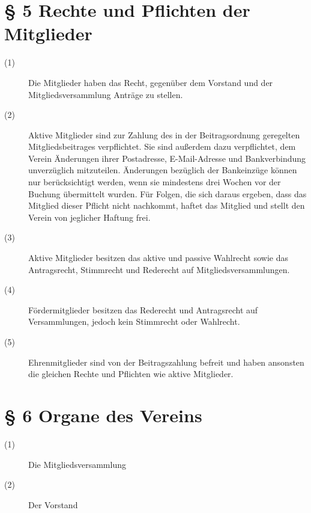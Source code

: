 \documentclass[a4paper,12pt]{scrartcl}
\begin{document}
\begin{description}
\end{description}



\section*{\S{} 5 Rechte und Pflichten der Mitglieder}
\begin{description} 

\item[(1)] Die Mitglieder haben das Recht, gegenüber dem Vorstand und der Mitgliedsversammlung Anträge zu stellen.
\item[(2)] Aktive Mitglieder sind zur Zahlung des in der Beitragsordnung geregelten Mitgliedsbeitrages verpflichtet. Sie sind außerdem dazu verpflichtet, dem Verein Änderungen ihrer Postadresse, E-Mail-Adresse und Bankverbindung unverzüglich mitzuteilen. Änderungen bezüglich der Bankeinzüge können nur berücksichtigt werden, wenn sie mindestens drei Wochen vor der Buchung übermittelt wurden. Für Folgen, die sich daraus ergeben, dass das Mitglied dieser Pflicht nicht nachkommt, haftet das Mitglied und stellt den Verein von jeglicher Haftung frei.
\item[(3)] Aktive Mitglieder besitzen das aktive und passive Wahlrecht sowie das Antragsrecht, Stimmrecht und Rederecht auf Mitgliedsversammlungen.
\item[(4)] Fördermitglieder besitzen das Rederecht und Antragsrecht auf Versammlungen, jedoch kein Stimmrecht oder Wahlrecht.
\item[(5)] Ehrenmitglieder sind von der Beitragszahlung befreit und haben ansonsten die gleichen Rechte und Pflichten wie aktive Mitglieder.

\end{description}



\section*{\S{} 6 Organe des Vereins}
\begin{description} 

\item[(1)] Die Mitgliedsversammlung
\item[(2)] Der Vorstand

\end{description}
\end{document}
